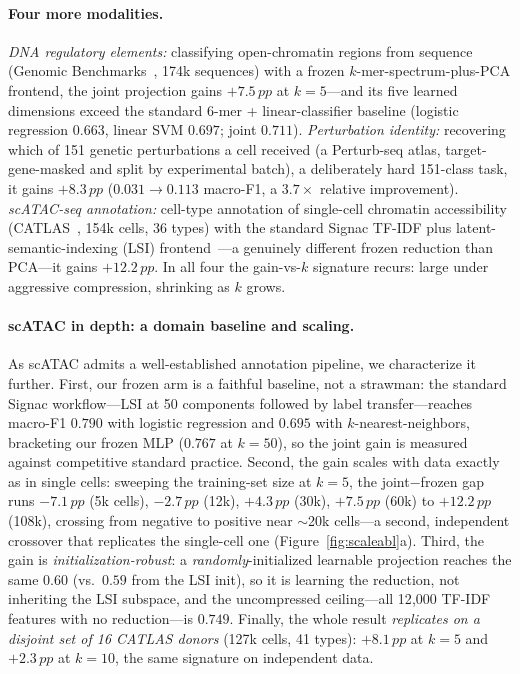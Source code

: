 \documentclass[10pt,twocolumn]{article}
\newcommand{\pp}{\,pp}
\begin{document}
\paragraph{Four more modalities.} \emph{DNA regulatory elements:} classifying open-chromatin
regions from sequence (Genomic Benchmarks~\citep{gresova2023}, 174k sequences) with a frozen
$k$-mer-spectrum-plus-PCA frontend, the joint projection gains $+7.5\pp$ at $k{=}5$---and its
five learned dimensions exceed the standard 6-mer + linear-classifier baseline (logistic
regression $0.663$, linear SVM $0.697$; joint $0.711$).
\emph{Perturbation identity:} recovering which of 151 genetic perturbations a cell received
(a Perturb-seq atlas, target-gene-masked and split by experimental batch), a deliberately
hard 151-class task, it gains $+8.3\pp$ ($0.031\!\to\!0.113$ macro-F1, a $3.7\times$ relative
improvement). \emph{scATAC-seq annotation:} cell-type annotation of single-cell chromatin
accessibility (CATLAS~\citep{zhang2021catlas}, 154k cells, 36 types) with the standard
Signac TF-IDF plus latent-semantic-indexing (LSI) frontend~\citep{stuart2021signac}---a
genuinely different frozen reduction than PCA---it gains $+12.2\pp$. In all four the
gain-vs-$k$ signature recurs: large under aggressive compression, shrinking as $k$ grows.

\paragraph{scATAC in depth: a domain baseline and scaling.} As scATAC admits a
well-established annotation pipeline, we characterize it further. First, our frozen arm is
a faithful baseline, not a strawman: the standard Signac workflow---LSI at 50 components
followed by label transfer---reaches macro-F1 $0.790$ with logistic regression and $0.695$
with $k$-nearest-neighbors, bracketing our frozen MLP ($0.767$ at $k{=}50$), so the joint
gain is measured against competitive standard practice. Second, the gain scales with data
exactly as in single cells: sweeping the training-set size at $k{=}5$, the joint$-$frozen
gap runs $-7.1\pp$ (5k cells), $-2.7\pp$ (12k), $+4.3\pp$ (30k), $+7.5\pp$ (60k) to
$+12.2\pp$ (108k), crossing from negative to positive near $\sim$20k cells---a second,
independent crossover that replicates the single-cell one (Figure~\ref{fig:scaleabl}a).
Third, the gain is \emph{initialization-robust}: a \emph{randomly}-initialized learnable
projection reaches the same $0.60$ (vs.\ $0.59$ from the LSI init), so it is learning the
reduction, not inheriting the LSI subspace, and the uncompressed ceiling---all 12{,}000
TF-IDF features with no reduction---is $0.749$. Finally, the whole result \emph{replicates on
a disjoint set of 16 CATLAS donors} (127k cells, 41 types): $+8.1\pp$ at $k{=}5$ and
$+2.3\pp$ at $k{=}10$, the same signature on independent data.
\end{document}
